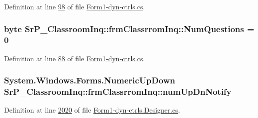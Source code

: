 \-Definition at line \hyperlink{_form1-dyn-ctrls_8cs_source_l00098}{98} of file \hyperlink{_form1-dyn-ctrls_8cs_source}{\-Form1-\/dyn-\/ctrls.\-cs}.

\hypertarget{class_sr_p___classroom_inq_1_1frm_classrrom_inq_a7e4d497088afdd32623b3b54749210a0}{
\subsubsection[{\-Num\-Questions}]{\setlength{\rightskip}{0pt plus 5cm}byte {\bf \-Sr\-P\-\_\-\-Classroom\-Inq\-::frm\-Classrrom\-Inq\-::\-Num\-Questions} = 0}}
\label{class_sr_p___classroom_inq_1_1frm_classrrom_inq_a7e4d497088afdd32623b3b54749210a0}


\-Definition at line \hyperlink{_form1-dyn-ctrls_8cs_source_l00088}{88} of file \hyperlink{_form1-dyn-ctrls_8cs_source}{\-Form1-\/dyn-\/ctrls.\-cs}.

\hypertarget{class_sr_p___classroom_inq_1_1frm_classrrom_inq_aaa513f17dd8bb353240daa4c342493cd}{
\subsubsection[{num\-Up\-Dn\-Notify}]{\setlength{\rightskip}{0pt plus 5cm}\-System.\-Windows.\-Forms.\-Numeric\-Up\-Down {\bf \-Sr\-P\-\_\-\-Classroom\-Inq\-::frm\-Classrrom\-Inq\-::num\-Up\-Dn\-Notify}}}
\label{class_sr_p___classroom_inq_1_1frm_classrrom_inq_aaa513f17dd8bb353240daa4c342493cd}


\-Definition at line \hyperlink{_form1-dyn-ctrls_8_designer_8cs_source_l02020}{2020} of file \hyperlink{_form1-dyn-ctrls_8_designer_8cs_source}{\-Form1-\/dyn-\/ctrls.\-Designer.\-cs}.

